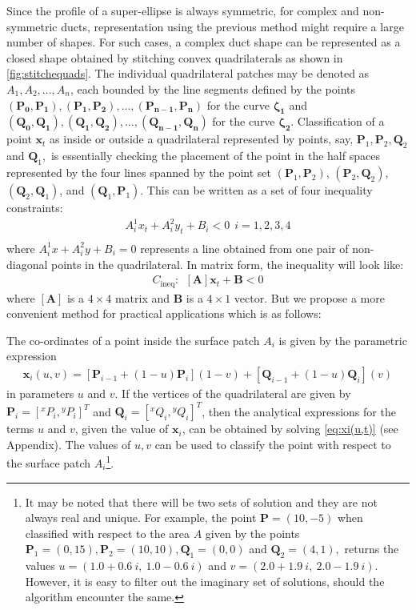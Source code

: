 \documentclass[12pt,a4]{article}
\begin{document}
Since the profile of a super-ellipse is always symmetric, for complex and non-symmetric ducts, representation using the previous method might require a large number of shapes. For such cases, a complex duct shape can be represented as a closed shape obtained by stitching convex quadrilaterals as shown in \ref{fig:stitchequads}. The individual quadrilateral patches may be denoted as $A_1,A_2,...,A_n$, each bounded by the line segments defined by the points $\mathbf{(P_0,P_1),(P_1,P_2),...,(P_{n-1},P_n)}$ for the curve $\mathbf{\zeta_1}$ and $\mathbf{(Q_0,Q_1),(Q_1,Q_2),...,(Q_{n-1},Q_n)}$ for the curve $\mathbf{\zeta_2}$. Classification of a point $\mathbf{x}_t$ as inside or outside a quadrilateral represented by points, say, $\mathbf{P}_1,\mathbf{P}_2,\mathbf{Q}_2$ and $\mathbf{Q}_1,$ is essentially checking the placement of the point in the half spaces represented by the four lines spanned by the point set $\left(\mathbf{P}_1,\mathbf{P}_2\right)$, $\left(\mathbf{P}_2,\mathbf{Q}_2\right)$, $\left(\mathbf{Q}_2,\mathbf{Q}_1\right)$, and $\left(\mathbf{Q}_1,\mathbf{P}_1\right)$. This can be written as a set of four inequality constraints:
\begin{align}
A^1_i x_t+ A^2_i y_t +B_i <0 ~~ i=1,2,3,4\\
\end{align}
where $A_i^1 x+A_i^2y+B_i=0$ represents a line obtained from one pair of non-diagonal points in the quadrilateral. In matrix form, the inequality will look like:
\begin{align}
C_\text{ineq}:~~ \left[\mathbf{A} \right] \mathbf{x}_t +\mathbf{B} <0
\end{align}
where $\left[\mathbf{A} \right]$ is a $4\times 4$ matrix and $\mathbf{B}$ is a $4 \times 1$ vector.
But we propose a more convenient method for practical applications which is as follows:

The co-ordinates of a point inside the surface patch $A_i$ is given by the parametric expression
\begin{align}
\label{eq:xi(u,t)}
\mathbf{x}_i(u,v)= \left[ \mathbf{P}_{i-1}+\left(1-{u} \right)\mathbf{P}_i  \right]\left(1-{v}\right) +\left[\mathbf{ Q}_{i-1}+\left(1-{u} \right)\mathbf{Q}_i  \right]\left({v}\right)
\end{align}
in parameters $u$ and $v$. If the vertices of the quadrilateral are given by $\mathbf{P}_{i}=\left[ {}^xP_{i},{}^yP_{i}\right]^T $ and $\mathbf{Q}_{i}=\left[ {}^xQ_{i},{}^yQ_{i}\right]^T $, then the analytical expressions for the terms $u$ and ${v}$, given the value of $\mathbf{x}_i$, can be obtained by solving \ref{eq:xi(u,t)} (see Appendix). The values of $u,v$ can be used to classify the point with respect to the surface patch $A_i$\footnote{It may be noted that there will be two sets of solution and they are not always real and unique. For example, the point $\mathbf{P} =\left(10,-5 \right)$ when classified with respect to the area $A$ given by the points $\mathbf{P}_1 = \left(0,15 \right),\mathbf{P}_2 = \left(10,10 \right),\mathbf{Q}_1 = \left(0,0 \right)$ and $\mathbf{Q}_2 = \left(4,1 \right),$ returns the values $u=\left( 1.0 + 0.6~i,~1.0 - 0.6~i \right)$ and $v=\left(2.0 + 1.9~i,~2.0 - 1.9~i\right)$. However, it is easy to filter out the imaginary set of solutions, should the algorithm encounter the same.}.
\end{document}
